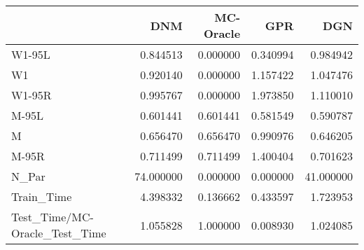 \begin{tabular}{lrrrr}
\toprule
{} &        DNM &  MC-Oracle &       GPR &        DGN \\
\midrule
W1-95L                        &   0.844513 &   0.000000 &  0.340994 &   0.984942 \\
W1                            &   0.920140 &   0.000000 &  1.157422 &   1.047476 \\
W1-95R                        &   0.995767 &   0.000000 &  1.973850 &   1.110010 \\
M-95L                         &   0.601441 &   0.601441 &  0.581549 &   0.590787 \\
M                             &   0.656470 &   0.656470 &  0.990976 &   0.646205 \\
M-95R                         &   0.711499 &   0.711499 &  1.400404 &   0.701623 \\
N\_Par                         &  74.000000 &   0.000000 &  0.000000 &  41.000000 \\
Train\_Time                    &   4.398332 &   0.136662 &  0.433597 &   1.723953 \\
Test\_Time/MC-Oracle\_Test\_Time &   1.055828 &   1.000000 &  0.008930 &   1.024085 \\
\bottomrule
\end{tabular}
